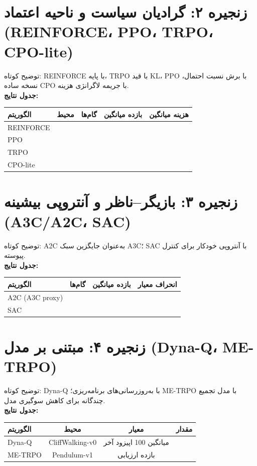 \documentclass[12pt]{article}
\begin{document}
\section{زنجیره ۲: گرادیان سیاست و ناحیه اعتماد (REINFORCE، PPO، TRPO، CPO-lite)}
توضیح کوتاه: REINFORCE با پایه، TRPO با قید KL، PPO با برش نسبت احتمال، نسخه ساده CPO با جریمه لاگرانژی هزینه.\\
\textbf{جدول نتایج:}
\begin{table}[h]
    \centering
    \begin{tabular}{lcccc}
    \toprule
    الگوریتم & محیط & گام‌ها & بازده میانگین & هزینه میانگین \\
    \midrule
    REINFORCE & & & & \\
    PPO & & & & \\
    TRPO & & & & \\
    CPO-lite & & & & \\
    \bottomrule
    \end{tabular}
\end{table}

\section{زنجیره ۳: بازیگر--ناظر و آنتروپی بیشینه (A3C/A2C، SAC)}
توضیح کوتاه: A2C به‌عنوان جایگزین سبک A3C؛ SAC با آنتروپی خودکار برای کنترل پیوسته.\\
\textbf{جدول نتایج:}
\begin{table}[h]
    \centering
    \begin{tabular}{lccc}
    \toprule
    الگوریتم & گام‌ها & بازده میانگین & انحراف معیار \\
    \midrule
    A2C (A3C proxy) & & & \\
    SAC & & & \\
    \bottomrule
    \end{tabular}
\end{table}

\section{زنجیره ۴: مبتنی بر مدل (Dyna-Q، ME-TRPO)}
توضیح کوتاه: Dyna-Q با به‌روزرسانی‌های برنامه‌ریزی؛ ME-TRPO با مدل تجمیع چندگانه برای کاهش سوگیری مدل.\\
\textbf{جدول نتایج:}
\begin{table}[h]
    \centering
    \begin{tabular}{lccc}
    \toprule
    الگوریتم & محیط & معیار & مقدار \\
    \midrule
    Dyna-Q & CliffWalking-v0 & میانگین 100 اپیزود آخر & \\
    ME-TRPO & Pendulum-v1 & بازده ارزیابی & \\
    \bottomrule
    \end{tabular}
\end{table}
\end{document}
